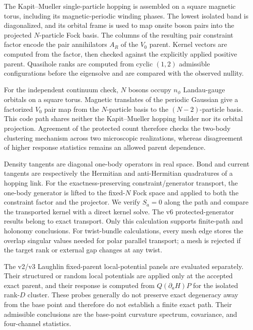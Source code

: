 The Kapit--Mueller single-particle hopping is assembled on a square magnetic
torus, including its magnetic-periodic winding phases.  The lowest isolated
band is diagonalized, and its orbital frame is used to map onsite boson pairs
into the projected $N$-particle Fock basis.  The columns of the resulting pair
constraint factor encode the pair annihilators $A_R$ of the $V_0$ parent.
Kernel vectors are computed from the factor,
then checked against the explicitly applied positive parent.  Quasihole ranks
are computed from cyclic $(1,2)$ admissible configurations before the
eigensolve and are compared with the observed nullity.

For the independent continuum check, $N$ bosons occupy $n_\phi$ Landau-gauge
orbitals on a square torus.  Magnetic translates of the periodic Gaussian
give a factorized $V_0$ pair map from the $N$-particle basis to the
$(N-2)$-particle basis.  This code path shares neither the Kapit--Mueller
hopping builder nor its orbital projection.  Agreement of the protected count
therefore checks the two-body clustering mechanism across two microscopic
realizations, whereas disagreement of higher response statistics remains an
allowed parent dependence.

Density tangents are diagonal one-body operators in real space.  Bond and
current tangents are respectively the Hermitian and anti-Hermitian quadratures
of a hopping link.  For the exactness-preserving constraint/generator
transport, the one-body generator is lifted to the fixed-$N$ Fock space and
applied to both the constraint factor and the projector.  We verify $S_a=0$
along the path and compare the transported kernel with a direct kernel solve.
The v6 protected-generator results belong to exact transport.  Only this
calculation supports finite-path and holonomy conclusions.  For twist-bundle
calculations, every mesh edge stores the overlap singular values needed for
polar parallel transport; a mesh is rejected if the target rank or external
gap changes at any twist.

The v2/v3 Laughlin fixed-parent local-potential panels are evaluated
separately.  Their structured or random local potentials are applied only at
the accepted exact parent, and their response is computed from
$Q(\partial_aH)P$ for the isolated rank-$D$ cluster.  These probes generally
do not preserve exact degeneracy away from the base point and therefore do
not establish a finite exact path.  Their admissible conclusions are the
base-point curvature spectrum, covariance, and four-channel statistics.

